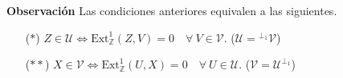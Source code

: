 \documentclass[preview]{standalone}
\begin{document}
\begin{center}
\justifying \textbf{Observación} Las condiciones anteriores equivalen a las siguientes.\begin{itemize} \item[($\ast$)] $Z\in\mathcal{U} \iff \text{Ext}^1_\mathbb{Z}(Z,V) = 0 \quad \forall \ V\in\mathcal{V}$. \quad ($\mathcal{U} = {}^{\perp_1}\mathcal{V}$) \item[($\ast\ast$)] $X\in\mathcal{V} \iff \text{Ext}^1_\mathbb{Z}(U,X) = 0 \quad \forall \ U\in\mathcal{U}$. \quad ($\mathcal{V} = \mathcal{U}^{\perp_1}$) \end{itemize}
\end{center}
\end{document}
